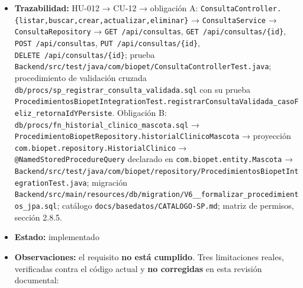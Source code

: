 \documentclass[
  spanish,
]{article}
\begin{document}
\begin{itemize}
  controlador equivalente a
  \texttt{Mascota\allowbreak{}Controller\allowbreak{}Test.\allowbreak{}dueno\allowbreak{}Consulta\allowbreak{}Mascota\allowbreak{}De\allowbreak{}Otro\allowbreak{}Duenio\allowbreak{}Devuelve403},
  a escribir cuando el endpoint exista.
\item
  \textbf{Trazabilidad:} HU-012 → CU-12 → obligación A:
  \texttt{Consulta\allowbreak{}Controller.\allowbreak{}\{listar,\allowbreak{}buscar,\allowbreak{}crear,\allowbreak{}actualizar,\allowbreak{}eliminar\}}
  → \texttt{Consulta\allowbreak{}Service} → \texttt{Consulta\allowbreak{}Repository} →
  \texttt{GET\ /\allowbreak{}api/\allowbreak{}consultas}, \texttt{GET\ /\allowbreak{}api/\allowbreak{}consultas/\allowbreak{}\{id\}},
  \texttt{POST\ /\allowbreak{}api/\allowbreak{}consultas}, \texttt{PUT\ /\allowbreak{}api/\allowbreak{}consultas/\allowbreak{}\{id\}},
  \texttt{DELETE\ /\allowbreak{}api/\allowbreak{}consultas/\allowbreak{}\{id\}}; prueba
  \texttt{Backend/\allowbreak{}src/\allowbreak{}test/\allowbreak{}java/\allowbreak{}com/\allowbreak{}biopet/\allowbreak{}Consulta\allowbreak{}Controller\allowbreak{}Test.\allowbreak{}java};
  procedimiento de validación cruzada
  \texttt{db/\allowbreak{}procs/\allowbreak{}sp\_\allowbreak{}registrar\_\allowbreak{}consu\allowbreak{}lta\_\allowbreak{}validada.\allowbreak{}sql} con su prueba
  \texttt{Procedimientos\allowbreak{}Biopet\allowbreak{}Integration\allowbreak{}Test.\allowbreak{}registrar\allowbreak{}Consulta\allowbreak{}Validada\_\allowbreak{}caso\allowbreak{}Feliz\_\allowbreak{}retorna\allowbreak{}Id\allowbreak{}YPersiste}.
  Obligación B: \texttt{db/\allowbreak{}procs/\allowbreak{}fn\_\allowbreak{}historial\_\allowbreak{}clini\allowbreak{}co\_\allowbreak{}mascota.\allowbreak{}sql} →
  \texttt{Procedimiento\allowbreak{}Biopet\allowbreak{}Repository.\allowbreak{}historial\allowbreak{}Clinico\allowbreak{}Mascota} →
  proyección \texttt{com.\allowbreak{}biopet.\allowbreak{}repository.\allowbreak{}Historial\allowbreak{}Clinico} →
  \texttt{@Named\allowbreak{}Stored\allowbreak{}Procedure\allowbreak{}Query} declarado en
  \texttt{com.\allowbreak{}biopet.\allowbreak{}entity.\allowbreak{}Mascota} →
  \texttt{Backend/\allowbreak{}src/\allowbreak{}test/\allowbreak{}java/\allowbreak{}com/\allowbreak{}biopet/\allowbreak{}repository/\allowbreak{}Procedimientos\allowbreak{}Biopet\allowbreak{}Integration\allowbreak{}Test.\allowbreak{}java};
  migración
  \texttt{Backend/\allowbreak{}src/\allowbreak{}main/\allowbreak{}resources/\allowbreak{}db/\allowbreak{}migration/\allowbreak{}V6\_\allowbreak{}\_\allowbreak{}formalizar\_\allowbreak{}proc\allowbreak{}edimientos\_\allowbreak{}jpa.\allowbreak{}sql};
  catálogo \texttt{docs/\allowbreak{}basedatos/\allowbreak{}CATALOGO-\allowbreak{}SP.\allowbreak{}md}; matriz de permisos,
  sección 2.8.5.
\item
  \textbf{Estado:} implementado
\item
  \textbf{Observaciones:} el requisito \textbf{no está cumplido}. Tres
  limitaciones reales, verificadas contra el código actual y \textbf{no
  corregidas} en esta revisión documental:


\end{itemize}
\end{document}
